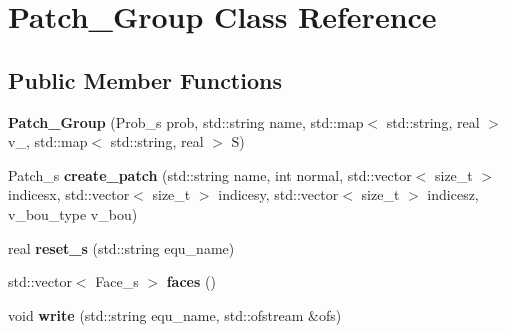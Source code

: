 \hypertarget{classPatch__Group}{
\section{Patch\_\-Group Class Reference}
\label{classPatch__Group}
}
\subsection*{Public Member Functions}
\begin{DoxyCompactItemize}
\item 
\hypertarget{classPatch__Group_a7585b36431136e14c2d17e84388969be}{
{\bfseries Patch\_\-Group} (Prob\_\-s prob, std::string name, std::map$<$ std::string, real $>$ v\_, std::map$<$ std::string, real $>$ S)}
\label{classPatch__Group_a7585b36431136e14c2d17e84388969be}

\item 
\hypertarget{classPatch__Group_adf8356da2a347dc023809477d8e2e562}{
Patch\_\-s {\bfseries create\_\-patch} (std::string name, int normal, std::vector$<$ size\_\-t $>$ indicesx, std::vector$<$ size\_\-t $>$ indicesy, std::vector$<$ size\_\-t $>$ indicesz, v\_\-bou\_\-type v\_\-bou)}
\label{classPatch__Group_adf8356da2a347dc023809477d8e2e562}

\item 
\hypertarget{classPatch__Group_ada9f56e3be9279ff5d555f2192cfc45b}{
real {\bfseries reset\_\-s} (std::string equ\_\-name)}
\label{classPatch__Group_ada9f56e3be9279ff5d555f2192cfc45b}

\item 
\hypertarget{classPatch__Group_a326628f83583bb2194f8c82548e9b6b3}{
std::vector$<$ Face\_\-s $>$ {\bfseries faces} ()}
\label{classPatch__Group_a326628f83583bb2194f8c82548e9b6b3}

\item 
\hypertarget{classPatch__Group_a3de7d3df9923795d4cbfa4d908e53598}{
void {\bfseries write} (std::string equ\_\-name, std::ofstream \&ofs)}
\label{classPatch__Group_a3de7d3df9923795d4cbfa4d908e53598}

\end{DoxyCompactItemize}
